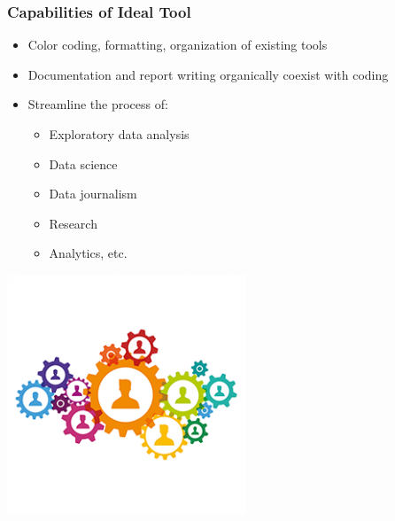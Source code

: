 \documentclass[xcolor={dvipsnames}]{beamer}
\newcommand{\ft}{\frametitle}
\newcommand{\bi}{\begin{itemize}}
\newcommand{\ei}{\end{itemize}}
\begin{document}
\begin{frame}
\ft{Capabilities of Ideal Tool}
\begin{minipage}{.45\textwidth}
\bi
	\item Color coding, formatting, organization of existing tools
	\item Documentation and report writing organically coexist with coding
	\item Streamline the process of:
		\bi
			\item Exploratory data analysis
			\item Data science
			\item Data journalism
			\item Research
			\item Analytics, etc.
		\ei
\ei
\end{minipage}
\begin{minipage}{.45\textwidth}
\begin{center}
	\includegraphics[width = \textwidth]{people-gears.PNG}
\end{center}
\end{minipage}
\end{frame}
\end{document}
